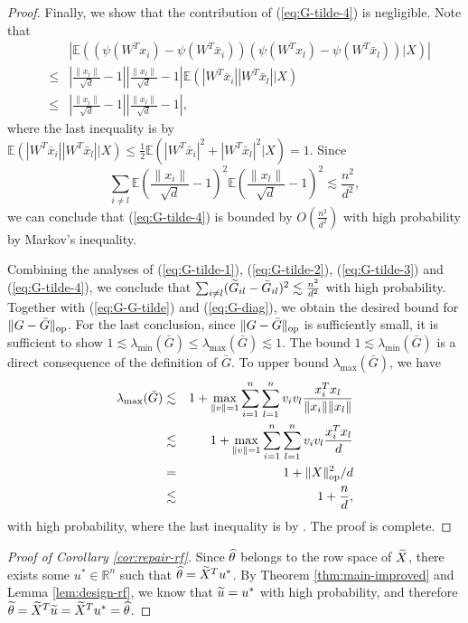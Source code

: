 \begin{proof}
Finally, we show that the contribution of (\ref{eq:G-tilde-4}) is negligible. Note that
\begin{eqnarray*}
&& \left|\mathbb{E}\left((\psi(W^Tx_i)-\psi(W^T\bar{x}_i))(\psi(W^Tx_l)-\psi(W^T\bar{x}_l))|X\right)\right| \\
&\leq& \left|\frac{\|x_i\|}{\sqrt{d}}-1\right|\left|\frac{\|x_l\|}{\sqrt{d}}-1\right|\mathbb{E}\left(|W^T\bar{x}_i||W^T\bar{x}_l||X\right) \\
&\leq& \left|\frac{\|x_i\|}{\sqrt{d}}-1\right|\left|\frac{\|x_l\|}{\sqrt{d}}-1\right|,
\end{eqnarray*}
where the last inequality is by $\mathbb{E}\left(|W^T\bar{x}_i||W^T\bar{x}_l||X\right)\leq \frac{1}{2}\mathbb{E}(|W^T\bar{x}_i|^2+|W^T\bar{x}_l|^2|X)=1$.
Since
$$\sum_{i\neq l}\mathbb{E}\left(\frac{\|x_i\|}{\sqrt{d}}-1\right)^2\mathbb{E}\left(\frac{\|x_l\|}{\sqrt{d}}-1\right)^2\lesssim \frac{n^2}{d^2},$$
we can conclude that (\ref{eq:G-tilde-4}) is bounded by $O\left(\frac{n^2}{d^2}\right)$ with high probability by Markov's inequality.

Combining the analyses of (\ref{eq:G-tilde-1}), (\ref{eq:G-tilde-2}), (\ref{eq:G-tilde-3}) and (\ref{eq:G-tilde-4}), we conclude that $\sum_{i\neq l}(\widetilde{G}_{il}-\bar{G}_{il})^2\lesssim \frac{n^2}{d^2}$ with high probability. Together with (\ref{eq:G-G-tilde}) and (\ref{eq:G-diag}), we obtain the desired bound for $\|G-\bar{G}\|_{\rm op}$.
For the last conclusion, since $\|G-\bar{G}\|_{\rm op}$ is sufficiently small, it is sufficient to show $1\lesssim\lambda_{\min}(\bar{G})\leq\lambda_{\max}(\bar{G})\lesssim 1$. The bound $1\lesssim\lambda_{\min}(\bar{G})$ is a direct consequence of the definition of $\bar{G}$. To upper bound $\lambda_{\max}(\bar{G})$, we have
\begin{eqnarray*}
\lambda_{\max}(\bar{G}) &\lesssim& 1 + \max_{\|v\|=1}\sum_{i=1}^n\sum_{l=1}^nv_iv_l\frac{x_i^Tx_l}{\|x_i\|\|x_l\|} \\
&\lesssim& 1 + \max_{\|v\|=1}\sum_{i=1}^n\sum_{l=1}^nv_iv_l\frac{x_i^Tx_l}{d} \\
&=& 1 + \opnorm{X}^2/d \\
&\lesssim& 1 + \frac{n}{d},
\end{eqnarray*}
with high probability, where the last inequality is by \cite{davidson2001local}. The proof is complete.
\end{proof}



\begin{proof}[Proof of Corollary \ref{cor:repair-rf}]
Since $\widehat{\theta}$ belongs to the row space of $\widetilde{X}$, there exists some $u^*\in\mathbb{R}^n$ such that $\widehat{\theta}=\widetilde{X}^Tu^*$.
By Theorem \ref{thm:main-improved} and Lemma \ref{lem:design-rf}, we know that $\widetilde{u}=u^*$ with high probability, and therefore $\widetilde{\theta}=\widetilde{X}^T\widetilde{u}=\widetilde{X}^Tu^*=\widehat{\theta}$.
\end{proof}




